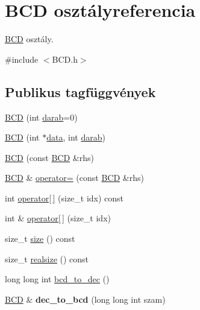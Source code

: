 \hypertarget{class_b_c_d}{}\section{B\+CD osztályreferencia}
\label{class_b_c_d}


\hyperlink{class_b_c_d}{B\+CD} osztály.  




{\ttfamily \#include $<$B\+C\+D.\+h$>$}

\subsection*{Publikus tagfüggvények}
\begin{DoxyCompactItemize}
\item 
\hyperlink{class_b_c_d_a036c13c5c4a31a296f4f00a543011489}{B\+CD} (int \hyperlink{class_b_c_d_a16422fa6a3f031ad2243c4827ece3055}{darab}=0)
\item 
\hyperlink{class_b_c_d_a7786cfcdd395555f47955306741add38}{B\+CD} (int $\ast$\hyperlink{class_b_c_d_a58a8646f5f9c9244cf1038f7f614a367}{data}, int \hyperlink{class_b_c_d_a16422fa6a3f031ad2243c4827ece3055}{darab})
\item 
\hyperlink{class_b_c_d_a0f6911801787e5707ce227a4637da3fc}{B\+CD} (const \hyperlink{class_b_c_d}{B\+CD} \&rhs)
\item 
\hyperlink{class_b_c_d}{B\+CD} \& \hyperlink{class_b_c_d_a12959ec1f3951001b6fd76a210837184}{operator=} (const \hyperlink{class_b_c_d}{B\+CD} \&rhs)
\item 
int \hyperlink{class_b_c_d_a71671a32e8937c07097d6dba7d0b847c}{operator\mbox{[}$\,$\mbox{]}} (size\+\_\+t idx) const 
\item 
int \& \hyperlink{class_b_c_d_a6e6fdc9df7d9a0867fe1624ab8ec7d5b}{operator\mbox{[}$\,$\mbox{]}} (size\+\_\+t idx)
\item 
size\+\_\+t \hyperlink{class_b_c_d_afe778ea1930caf69f6a5b47b8f08fa3c}{size} () const 
\item 
size\+\_\+t \hyperlink{class_b_c_d_a03add8c79d047d0813d633ec7cf94109}{realsize} () const 
\item 
long long int \hyperlink{class_b_c_d_a1f5006cd1ccd26f6594662ba6c18625a}{bcd\+\_\+to\+\_\+dec} ()
\item 
\hyperlink{class_b_c_d}{B\+CD} \& {\bfseries dec\+\_\+to\+\_\+bcd} (long long int szam)\hypertarget{class_b_c_d_aa64965daf734774c83f0e53c633d9caa}{}\label{class_b_c_d_aa64965daf734774c83f0e53c633d9caa}


\end{DoxyCompactItemize}
